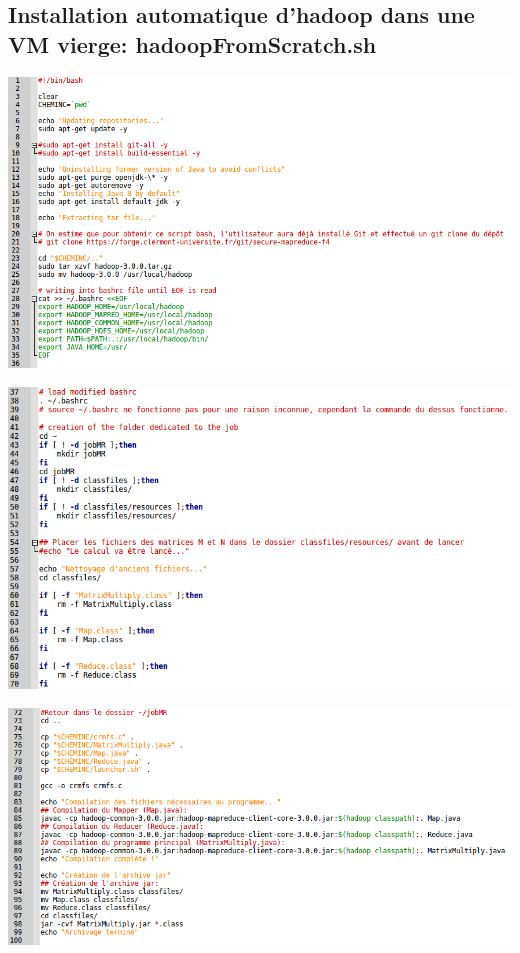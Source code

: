 \documentclass[a4paper, 11pt]{article}
\begin{document}
	\subsection{Installation automatique d'hadoop dans une VM vierge: hadoopFromScratch.sh}
    \vspace{2\baselineskip}
    \label{hfs1}
  	\begin{center}
        \includegraphics[scale=0.7, angle=90]{./img/hfs1.png}
    \end{center}
    \vspace{2\baselineskip}
    \clearpage

    \label{hfs2}
  	\begin{center}
        \includegraphics[scale=0.75, angle=90]{./img/hfs2.png}
    \end{center}
    \vspace{2\baselineskip}

    \label{hfs3}
  	\begin{center}
        \includegraphics[scale=0.75, angle=90]{./img/hfs3.png}
    \end{center}   
    
\end{document}
